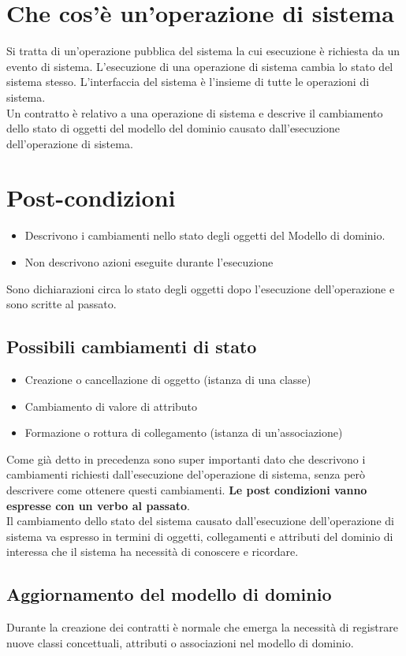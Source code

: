 \section{Che cos'è un'operazione di sistema}
Si tratta di un'operazione pubblica del sistema la cui esecuzione è richiesta da un evento di sistema.
L'esecuzione di una operazione di sistema cambia lo stato del sistema stesso.
L'interfaccia del sistema è l'insieme di tutte le operazioni di sistema.
\\ Un contratto è relativo a una operazione di sistema e descrive il cambiamento dello stato di oggetti del
modello del dominio causato dall'esecuzione dell'operazione di sistema.
\section{Post-condizioni}
\begin{itemize}
    \item Descrivono i cambiamenti nello stato degli oggetti del Modello di dominio.
    \item Non descrivono azioni eseguite durante l'esecuzione
\end{itemize}
Sono dichiarazioni circa lo stato degli oggetti dopo l'esecuzione dell'operazione e sono scritte al passato.
\subsection{Possibili cambiamenti di stato}
\begin{itemize}
    \item Creazione o cancellazione di oggetto (istanza di una classe)
    \item Cambiamento di valore di attributo
    \item Formazione o rottura di collegamento (istanza di un'associazione)
\end{itemize}
Come già detto in precedenza sono super importanti dato che descrivono i cambiamenti richiesti dall'esecuzione
del'operazione di sistema, senza però descrivere come ottenere questi cambiamenti.
\textbf{Le post condizioni vanno espresse con un verbo al passato}.
\\ Il cambiamento dello stato del sistema causato dall'esecuzione dell'operazione di sistema va espresso
in termini di oggetti, collegamenti e attributi del dominio di interessa che il sistema ha necessità di conoscere
e ricordare.
\subsection{Aggiornamento del modello di dominio}
Durante la creazione dei contratti è normale che emerga la necessità di registrare nuove classi concettuali,
attributi o associazioni nel modello di dominio.
